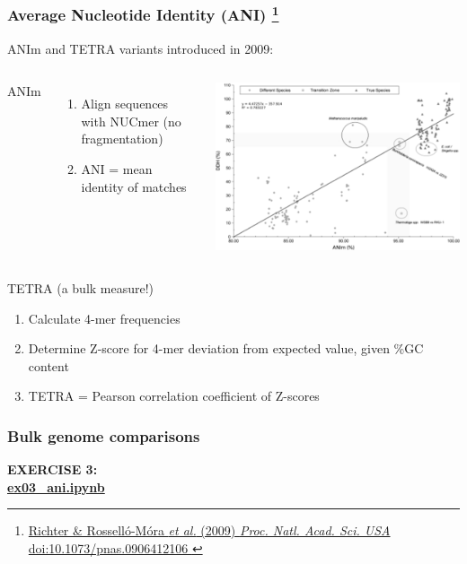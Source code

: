 %
\begin{frame}
  \frametitle{Average Nucleotide Identity (ANI)
  \footnote{\tiny{\href{http://dx.doi.org/10.1073/pnas.0906412106
}{Richter \& Rossell\'{o}-M\'{o}ra \textit{et al.} (2009) \textit{Proc. Natl. Acad. Sci. USA} doi:10.1073/pnas.0906412106
}}}
  }
  ANIm and TETRA variants introduced in 2009:
  \begin{columns}[T] 
      \textcolor{RawSienna}{ANIm}
      \begin{enumerate}
        \item \textcolor{hutton_green}{Align sequences with NUCmer (no fragmentation)}
        \item \textcolor{hutton_purple}{ANI = mean identity of matches}
      \end{enumerate}
      \includegraphics[width=\textwidth]{images/anim_ddh_equiv}
  \end{columns}    
  \textcolor{RawSienna}{TETRA} (a bulk measure!)
  \begin{enumerate}
    \item \textcolor{hutton_green}{Calculate 4-mer frequencies}
    \item \textcolor{hutton_blue}{Determine Z-score for 4-mer deviation from expected value, given \%GC content}
    \item \textcolor{hutton_purple}{TETRA = Pearson correlation coefficient of Z-scores}
  \end{enumerate}
\end{frame}

%
\begin{frame}
  \frametitle{Bulk genome comparisons}
  \Large{
    \textcolor{hutton_blue}{
      \textbf{
      EXERCISE 3: \\
      \url{ex03_ani.ipynb}
      }
    }
  }
\end{frame}

